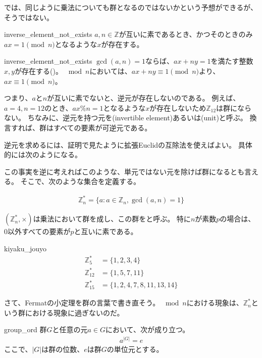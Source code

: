 では、同じように乗法についても群となるのではないかという予想ができるが、そうではない。

\begin{Prop}{}{inverse_element_not_exists}
$a,n\in\mathbb{Z}$が互いに素であるとき、かつそのときのみ$ax=1\pmod{n}$となるような$x$が存在する。
\end{Prop}

\begin{prProof}{inverse_element_not_exists}
$\gcd(a,n)=1$ならば、$ax+ny=1$を満たす整数$x,y$が存在する()。
$\bmod{n}$においては、$ax+ny\equiv1\pmod{n}$より、$ax\equiv1\pmod{n}$。
\end{prProof}

つまり、$a$と$n$が互いに素でないと、逆元が存在しないのである。
例えば、$a=4,n=12$のとき、$ax \% n =1$となるような$x$が存在しないため$\mathbb{Z}_{12}$は群にならない。
ちなみに、逆元を持つ元を(invertible element)あるいは(unit)と呼ぶ。
換言すれば、群はすべての要素が可逆元である。

逆元を求めるには、証明で見たように拡張Euclidの互除法を使えばよい。
具体的には次のようになる。


この事実を逆に考えればこのような、単元ではない元を除けば群になるとも言える。
そこで、次のような集合を定義する。

\begin{align*}
\mathbb{Z}_n^* = \{a : a \in \mathbb{Z}_n, \gcd(a,n) = 1\}
\end{align*}

$(\mathbb{Z}_n^*,\times)$は乗法において群を成し、この群をと呼ぶ。
特に$n$が素数$p$の場合は、$0$以外すべての要素が$p$と互いに素である。

\begin{Exam}{}{kiyaku_jouyo}
\begin{align*}
\mathbb{Z}^*_5 &= \{1, 2, 3, 4\}\\
\mathbb{Z}^*_{12} &= \{1, 5, 7, 11\}\\
\mathbb{Z}^*_{15} &= \{1,2,4,7,8,11,13,14\}
\end{align*}
\end{Exam}

さて、Fermatの小定理を群の言葉で書き直そう。
$\bmod{n}$における現象は、$\mathbb{Z}_n^*$という群における現象に過ぎないのだ。

\begin{Theo}{}{group_ord}
群$G$と任意の元$a\in G$において、次が成り立つ。
\begin{align*}
a^{|G|} = e
\end{align*}
ここで、$|G|$は群の位数、$e$は群$G$の単位元とする。
\end{Theo}


